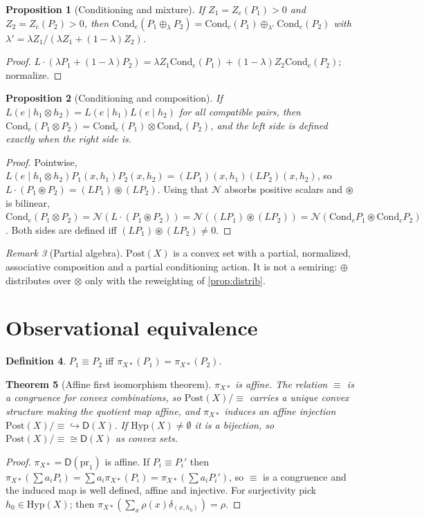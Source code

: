 \documentclass[11pt]{article}
\newtheorem{theorem}{Theorem}[section]
\newtheorem{proposition}[theorem]{Proposition}
\theoremstyle{definition}
\newtheorem{definition}[theorem]{Definition}
\theoremstyle{remark}
\newtheorem{remark}[theorem]{Remark}
\newcommand{\D}{\mathsf{D}}
\newcommand{\Hyp}{\mathrm{Hyp}}
\newcommand{\Post}{\mathrm{Post}}
\newcommand{\Cond}{\mathrm{Cond}}
\newcommand{\N}{\mathcal{N}}
\newcommand{\cp}{\circledast}
\begin{document}
\begin{proposition}[Conditioning and mixture]
If $Z_1=Z_e(P_1)>0$ and $Z_2=Z_e(P_2)>0$, then
$\Cond_e(P_1\oplus_\lambda P_2)=\Cond_e(P_1)\oplus_{\lambda'}\Cond_e(P_2)$ with
$\lambda'=\lambda Z_1/(\lambda Z_1+(1-\lambda)Z_2)$.
\end{proposition}
\begin{proof}
$L\cdot(\lambda P_1+(1-\lambda)P_2)=\lambda Z_1\Cond_e(P_1)+(1-\lambda)Z_2\Cond_e(P_2)$; normalize.
\end{proof}

\begin{proposition}[Conditioning and composition]\label{prop:cond-comp}
If $L(e\mid h_1\otimes h_2)=L(e\mid h_1)L(e\mid h_2)$ for all compatible pairs, then
$\Cond_e(P_1\otimes P_2)=\Cond_e(P_1)\otimes\Cond_e(P_2)$, and the left side is defined exactly when
the right side is.
\end{proposition}
\begin{proof}
Pointwise, $L(e\mid h_1\otimes h_2)P_1(x,h_1)P_2(x,h_2)=(LP_1)(x,h_1)(LP_2)(x,h_2)$, so
$L\cdot(P_1\cp P_2)=(LP_1)\cp(LP_2)$. Using that $\N$ absorbs positive scalars and $\cp$ is
bilinear, $\Cond_e(P_1\otimes P_2)=\N(L\cdot(P_1\cp P_2))=\N((LP_1)\cp(LP_2))
=\N(\Cond_eP_1\cp\Cond_eP_2)$. Both sides are defined iff $(LP_1)\cp(LP_2)\ne0$.
\end{proof}

\begin{remark}[Partial algebra]
$\Post(X)$ is a convex set with a partial, normalized, associative composition and a partial
conditioning action. It is not a semiring: $\oplus$ distributes over $\otimes$ only with the
reweighting of \cref{prop:distrib}.
\end{remark}

\section{Observational equivalence}\label{sec:obs}

\begin{definition}
$P_1\equiv P_2$ iff $\pi_{X*}(P_1)=\pi_{X*}(P_2)$.
\end{definition}

\begin{theorem}[Affine first isomorphism theorem]\label{thm:firstiso}
$\pi_{X*}$ is affine. The relation $\equiv$ is a congruence for convex combinations, so
$\Post(X)/{\equiv}$ carries a unique convex structure making the quotient map affine, and
$\pi_{X*}$ induces an affine injection $\Post(X)/{\equiv}\hookrightarrow\D(X)$. If
$\Hyp(X)\neq\emptyset$ it is a bijection, so $\Post(X)/{\equiv}\cong\D(X)$ as convex sets.
\end{theorem}
\begin{proof}
$\pi_{X*}=\D(\mathrm{pr}_1)$ is affine. If $P_i\equiv P_i'$ then
$\pi_{X*}(\sum a_iP_i)=\sum a_i\pi_{X*}(P_i)=\pi_{X*}(\sum a_iP_i')$, so $\equiv$ is a congruence and
the induced map is well defined, affine and injective. For surjectivity pick $h_0\in\Hyp(X)$; then
$\pi_{X*}(\sum_x\rho(x)\delta_{(x,h_0)})=\rho$.
\end{proof}
\end{document}
